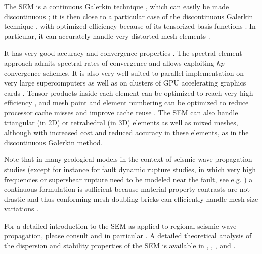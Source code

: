 The SEM is a continuous Galerkin technique \citep{TrKoLi08,PeKoLuMaLeCaLeMaLiBlNiBaTr11}, which can easily be made discontinuous \citep{BeMaPa94,Ch00,KoWoHu02,ChCaVi03,LaWaBe05,Kop06,WiStBuGh10,AcKo11}; it is then close to a particular case of the discontinuous Galerkin technique \citep{ReHi73,LeRa74,Arn82,JoPi86,BoMaHe91,FaRi99,HuHuRa99,CoKaSh00,GiHeWa02,RiWh03,MoRi05,GrScSc06,AiMoMu06,BeLaPi06,DuKa06,DeSeWh08,PuAmKa09,WiStBuGh10,DeSe10,EtChViGl10}, with optimized efficiency because of its tensorized basis functions \citep{WiStBuGh10,AcKo11}.
In particular, it can accurately handle very distorted mesh elements \citep{OlSe11}.\newline

It has very good accuracy and convergence properties \citep{MaPa89,SePr94,DeFiMu02,Coh02,DeSe07,SeOl08,AiWa09,AiWa10,MeStTh12}.
The spectral element approach admits spectral rates of convergence and allows exploiting $hp$-convergence schemes.
It is also very well suited to parallel implementation on very large supercomputers \citep{KoTsChTr03,TsKoChTr03,KoLaMi08a,CaKoLaTiMiLeSnTr08,KoViCh10}
as well as on clusters of GPU accelerating graphics cards \citep{Kom11,MiKo10,KoMiEr09,KoErGoMi10}.
Tensor products inside each element can be optimized to reach very high efficiency \citep{DeFiMu02}, and mesh point and element numbering can be optimized to reduce processor cache misses and improve cache reuse \citep{KoLaMi08a}. The SEM can also handle triangular (in 2D) or tetrahedral (in 3D) elements \citep{WinBoyd96,TaWi00,KoMaTrTaWi01,Coh02,MeViSa06} as well as mixed meshes, although with increased cost and reduced accuracy in these elements, as in the discontinuous Galerkin method.\newline

Note that in many geological models in the context of seismic wave propagation studies
(except for instance for fault dynamic rupture studies, in which very high frequencies or supershear rupture need to be modeled near the fault, see e.g. \cite{BeGlCrViPi07,BeGlCrVi09,PuAmKa09,TaCrEtViBeSa10})
a continuous formulation is sufficient because material property contrasts are not drastic and thus
conforming mesh doubling bricks can efficiently handle mesh size variations \citep{KoTr02a,KoLiTrSuStSh04,LeChLiKoHuTr08,LeChKoHuTr09,LeKoHuTr09}.\newline

For a detailed introduction to the SEM as applied to regional
seismic wave propagation, please consult \citet{PeKoLuMaLeCaLeMaLiBlNiBaTr11,TrKoLi08,KoVi98,KoTr99,ChKoViCaVaFe07} and
in particular \citet{LeKoHuTr09,LeChKoHuTr09,LeChLiKoHuTr08,GoAmTaCaSmSaMaKo09,WiKoScTr04,KoLiTrSuStSh04}.
A detailed theoretical analysis of the dispersion
and stability properties of the SEM is available in \citet{Coh02}, \citet{DeSe07}, \citet{SeOl07}, \citet{SeOl08} and \citet{MeStTh12}.\newline

